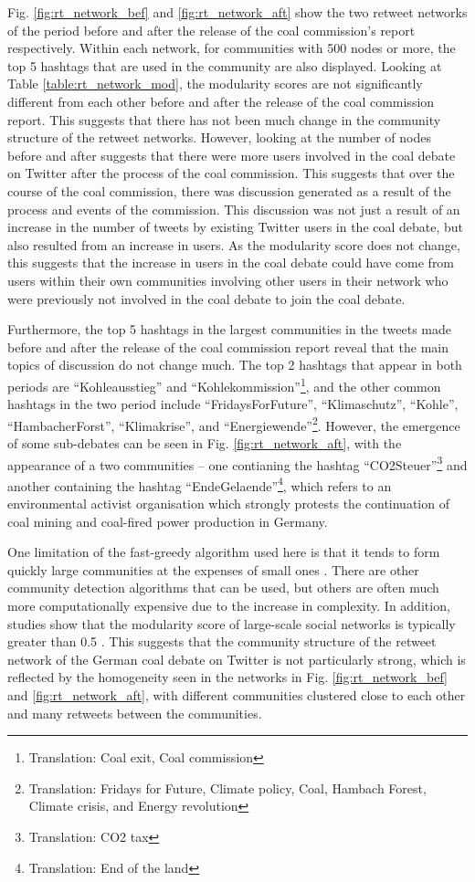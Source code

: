 \documentclass[12pt,onecolumn,twoside]{layout}
\begin{document}
Fig. \ref{fig:rt_network_bef} and \ref{fig:rt_network_aft} show the two retweet networks of the period before and after the release of the coal commission's report respectively. Within each network, for communities with 500 nodes or more, the top 5 hashtags that are used in the community are also displayed. Looking at Table \ref{table:rt_network_mod}, the modularity scores are not significantly different from each other before and after the release of the coal commission report. This suggests that there has not been much change in the community structure of the retweet networks. However, looking at the number of nodes before and after suggests that there were more users involved in the coal debate on Twitter after the process of the coal commission. This suggests that over the course of the coal commission, there was discussion generated as a result of the process and events of the commission. This discussion was not just a result of an increase in the number of tweets by existing Twitter users in the coal debate, but also resulted from an increase in users. As the modularity score does not change, this suggests that the increase in users in the coal debate could have come from users within their own communities involving other users in their network who were previously not involved in the coal debate to join the coal debate.

Furthermore, the top 5 hashtags in the largest communities in the tweets made before and after the release of the coal commission report reveal that the main topics of discussion do not change much. The top 2 hashtags that appear in both periods are ``Kohleausstieg'' and ``Kohlekommission''\footnote{Translation: Coal exit, Coal commission}, and the other common hashtags in the two period include ``FridaysForFuture'', ``Klimaschutz'', ``Kohle'', ``HambacherForst'', ``Klimakrise'', and ``Energiewende''\footnote{Translation: Fridays for Future, Climate policy, Coal, Hambach Forest, Climate crisis, and Energy revolution}. However, the emergence of some sub-debates can be seen in Fig. \ref{fig:rt_network_aft}, with the appearance of a two communities -- one contianing the hashtag ``CO2Steuer''\footnote{Translation: CO2 tax} and another containing the hashtag ``EndeGelaende''\footnote{Translation: End of the land}, which refers to an environmental activist organisation which strongly protests the continuation of coal mining and coal-fired power production in Germany. 

One limitation of the fast-greedy algorithm used here is that it tends to form quickly large communities at the expenses of small ones \citep{Fortunato2010}. There are other community detection algorithms that can be used, but others are often much more computationally expensive due to the increase in complexity. In addition, studies show that the modularity score of large-scale social networks is typically greater than 0.5 \citep{Blondel2008}. This suggests that the community structure of the retweet network of the German coal debate on Twitter is not particularly strong, which is reflected by the homogeneity seen in the networks in Fig. \ref{fig:rt_network_bef} and \ref{fig:rt_network_aft}, with different communities clustered close to each other and many retweets between the communities. 
\end{document}
